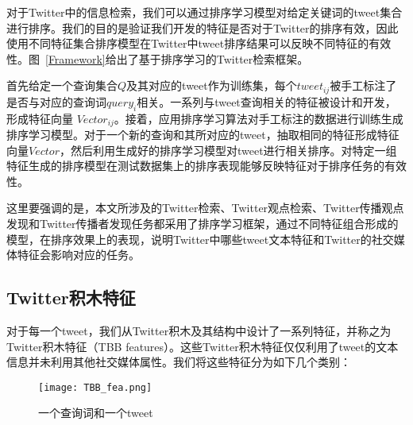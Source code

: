  对于Twitter中的信息检索，我们可以通过排序学习模型对给定关键词的tweet集合进行排序。我们的目的是验证我们开发的特征是否对于Twitter的排序有效，因此使用不同特征集合排序模型在Twitter中tweet排序结果可以反映不同特征的有效性。图~\ref{Framework}给出了基于排序学习的Twitter检索框架。
 

首先给定一个查询集合$Q$及其对应的tweet作为训练集，每个$tweet_{ij}$被手工标注了是否与对应的查询词$query_i$相关。一系列与tweet查询相关的特征被设计和开发，形成特征向量 $Vector_{ij}$。接着，应用排序学习算法对手工标注的数据进行训练生成排序学习模型。对于一个新的查询和其所对应的tweet，抽取相同的特征形成特征向量$Vector$，然后利用生成好的排序学习模型对tweet进行相关排序。对特定一组特征生成的排序模型在测试数据集上的排序表现能够反映特征对于排序任务的有效性。

这里要强调的是，本文所涉及的Twitter检索、Twitter观点检索、Twitter传播观点发现和Twitter传播者发现任务都采用了排序学习框架，通过不同特征组合形成的模型，在排序效果上的表现，说明Twitter中哪些tweet文本特征和Twitter的社交媒体特征会影响对应的任务。



 \subsection{Twitter积木特征}
 对于每一个tweet，我们从Twitter积木及其结构中设计了一系列特征，并称之为Twitter积木特征（TBB features）。这些Twitter积木特征仅仅利用了tweet的文本信息并未利用其他社交媒体属性。我们将这些特征分为如下几个类别：
 
 \begin{figure}[htp]
\centering
\texttt{[image: TBB\_fea.png]}
\caption{一个查询词和一个tweet}
\label{TBB_fea}
\end{figure}

